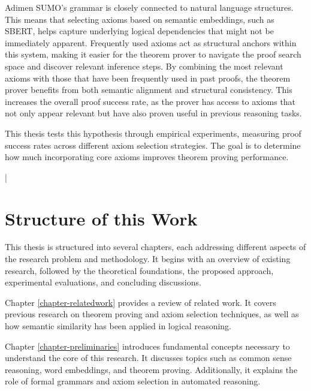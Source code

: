 \documentclass[english,version-2020-11]{uzl-thesis}
\begin{document}
Adimen SUMO's grammar is closely connected to natural language structures. 
This means that selecting axioms based on semantic embeddings, such as SBERT, helps capture underlying logical dependencies that might not be immediately apparent. Frequently used axioms act as structural anchors within this system, making it easier for the theorem prover to navigate the proof search space and discover relevant inference steps.
By combining the most relevant axioms with those that have been frequently used in past proofs, the theorem prover benefits from both semantic alignment and structural consistency. This increases the overall proof success rate, as the prover has access to axioms that not only appear relevant but have also proven useful in previous reasoning tasks.

This thesis tests this hypothesis through empirical experiments, measuring proof success rates across different axiom selection strategies. The goal is to determine how much incorporating core axioms improves theorem proving performance.


\lstMakeShortInline[style=code,style=inline,language={[LaTeX]tex},moretexcs={chapter}]|


%


\section{Structure of this Work}

This thesis is structured into several chapters, each addressing different aspects of the research problem and methodology. It begins with an overview of existing research, followed by the theoretical foundations, the proposed approach, experimental evaluations, and concluding discussions.

Chapter \ref{chapter-relatedwork} provides a review of related work. It covers previous research on theorem proving and axiom selection techniques, as well as how semantic similarity has been applied in logical reasoning.

Chapter \ref{chapter-preliminaries} introduces fundamental concepts necessary to understand the core of this research. It discusses topics such as common sense reasoning, word embeddings, and theorem proving. Additionally, it explains the role of formal grammars and axiom selection in automated reasoning.
\end{document}
